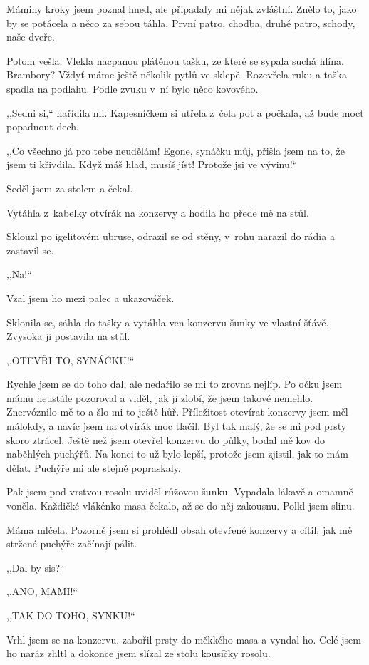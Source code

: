 Máminy kroky jsem poznal hned, ale připadaly mi nějak zvláštní. Znělo to, jako by se potácela a něco za sebou táhla. První patro, chodba, druhé patro, schody, naše dveře.

Potom vešla. Vlekla nacpanou plátěnou tašku, ze které se sypala suchá hlína. Brambory? Vždyť máme ještě několik pytlů ve sklepě. Rozevřela ruku a taška spadla na podlahu. Podle zvuku v ní bylo něco kovového.

,,Sedni si,`` nařídila mi. Kapesníčkem si utřela z čela pot a počkala, až bude moct popadnout dech. 

,,Co všechno já pro tebe neudělám! Egone, synáčku můj, přišla jsem na to, že jsem ti křivdila. Když máš hlad, musíš jíst! Protože jsi ve vývinu!``

Seděl jsem za stolem a čekal.

Vytáhla z kabelky otvírák na konzervy a hodila ho přede mě na stůl.

Sklouzl po igelitovém ubruse, odrazil se od stěny, v rohu narazil do rádia a zastavil se. 

,,Na!``

Vzal jsem ho mezi palec a ukazováček.

Sklonila se, sáhla do tašky a vytáhla ven konzervu šunky ve vlastní šťávě. Zvysoka ji postavila na stůl. 

,,OTEVŘI TO, SYNÁČKU!``

Rychle jsem se do toho dal, ale nedařilo se mi to zrovna nejlíp. Po očku jsem mámu neustále pozoroval a viděl, jak ji zlobí, že jsem takové nemehlo. Znervóznilo mě to a šlo mi to ještě hůř. Příležitost otevírat konzervy jsem měl málokdy, a navíc jsem na otvírák moc tlačil. Byl tak malý, že se mi pod prsty skoro ztrácel. Ještě než jsem otevřel konzervu do půlky, bodal mě kov do naběhlých puchýřů. Na konci to už bylo lepší, protože jsem zjistil, jak to mám dělat. Puchýře mi ale stejně popraskaly. 

Pak jsem pod vrstvou rosolu uviděl růžovou šunku. Vypadala lákavě a omamně voněla. Každičké vlákénko masa čekalo, až se do něj zakousnu. Polkl jsem slinu.

Máma mlčela. Pozorně jsem si prohlédl obsah otevřené konzervy a cítil, jak mě stržené puchýře začínají pálit.

,,Dal by sis?``

,,ANO, MAMI!``

,,TAK DO TOHO, SYNKU!``

Vrhl jsem se na konzervu, zabořil prsty do měkkého masa a vyndal ho. Celé jsem ho naráz zhltl a dokonce jsem slízal ze stolu kousíčky rosolu.


